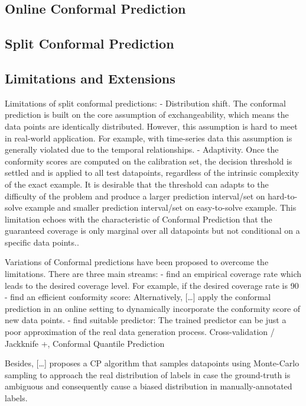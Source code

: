 \documentclass[a4paper,oneside,bibliography=totoc]{scrbook}
\begin{document}
\subsection{Online Conformal Prediction}
\subsection{Split Conformal Prediction}
\subsection{Limitations and Extensions}
Limitations of split conformal predictions:
- Distribution shift. The conformal prediction is built on the core assumption of exchangeability, which means the data points are identically distributed. However, this assumption is hard to meet in real-world application. For example, with time-series data this assumption is generally violated due to the temporal relationships. 
- Adaptivity. Once the conformity scores are computed on the calibration set, the decision threshold is settled and is applied to all test datapoints, regardless of the intrinsic complexity of the exact example. It is desirable that the threshold can adapts to the difficulty of the problem and produce a larger prediction interval/set on hard-to-solve example and smaller prediction interval/set on easy-to-solve example. This limitation echoes with the characteristic of Conformal Prediction that the guaranteed coverage is only marginal over all datapoints but not conditional on a specific data points..

Variations of Conformal predictions have been proposed to overcome the limitations. There are three main streams:
- find an empirical coverage rate which leads to the desired coverage level. For example, if the desired coverage rate is 90%
- find an efficient conformity score: Alternatively, […] apply the conformal prediction in an online setting to dynamically incorporate the conformity score of new data points.
- find suitable predictor: The trained predictor can be just a poor approximation of the real data generation process.
Cross-validation / Jackknife +, Conformal Quantile Prediction

Besides, […] proposes a CP algorithm that samples datapoints using Monte-Carlo sampling to approach the real distribution of labels in case the ground-truth is ambiguous and consequently cause a biased distribution in manually-annotated labels.
\end{document}
